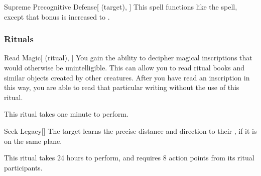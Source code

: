 \lowercase{\hypertarget{spell:Supreme Precognitive Defense}{}}\label{spell:Supreme Precognitive Defense}
\begin{attuneability}[Rank 8]{\hypertarget{spell:Supreme Precognitive Defense}{Supreme Precognitive Defense}}[ (target), ]
This spell functions like the  spell, except that bonus is increased to .
\end{attuneability}
\vspace{0.25em}



\subsubsection{Rituals}


\lowercase{\hypertarget{spell:Read Magic}{}}\label{spell:Read Magic}
\begin{attuneability}[Rank 1]{\hypertarget{spell:Read Magic}{Read Magic}}[ (ritual), ]
You gain the ability to decipher magical inscriptions that would otherwise be unintelligible.
This can allow you to read ritual books and similar objects created by other creatures.
After you have read an inscription in this way, you are able to read that particular writing without the use of this ritual.

This ritual takes one minute to perform.
\end{attuneability}
\vspace{0.25em}



\lowercase{\hypertarget{spell:Seek Legacy}{}}\label{spell:Seek Legacy}
\begin{apability}[Rank 3]{\hypertarget{spell:Seek Legacy}{Seek Legacy}}[]
The target learns the precise distance and direction to their , if it is on the same plane.

This ritual takes 24 hours to perform, and requires 8 action points from its ritual participants.
\end{apability}
\vspace{0.25em}



